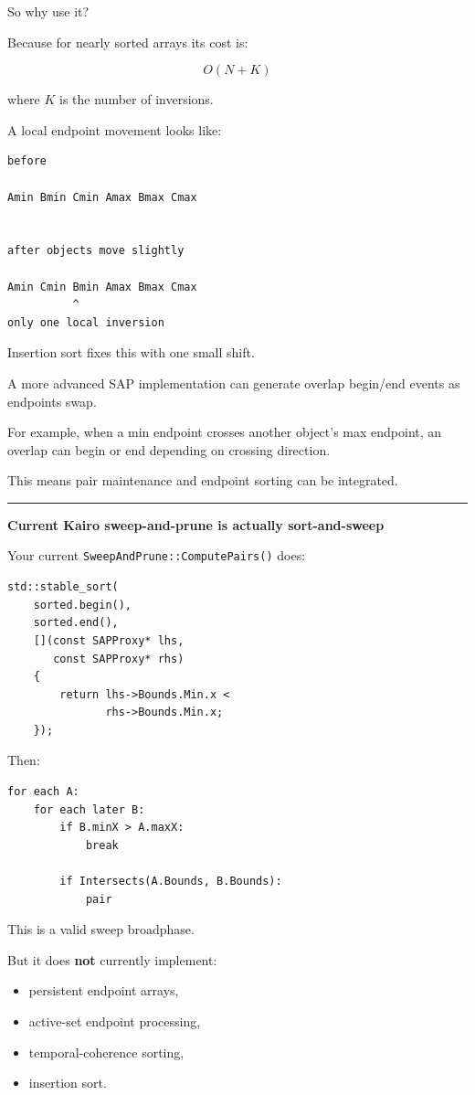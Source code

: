 So why use it?

Because for nearly sorted arrays its cost is:

\[
O(N+K)
\]

where \(K\) is the number of inversions.

A local endpoint movement looks like:

\begin{verbatim}
before

Amin Bmin Cmin Amax Bmax Cmax


after objects move slightly

Amin Cmin Bmin Amax Bmax Cmax
          ^
only one local inversion
\end{verbatim}

Insertion sort fixes this with one small shift.

A more advanced SAP implementation can generate overlap begin/end events as endpoints swap.

For example, when a min endpoint crosses another object's max endpoint, an overlap can begin or end depending on crossing direction.

This means pair maintenance and endpoint sorting can be integrated.

\begin{center}\rule{0.5\linewidth}{0.5pt}\end{center}

\textbf{Current Kairo sweep-and-prune is actually sort-and-sweep}

Your current \texttt{SweepAndPrune::ComputePairs()} does:

\begin{verbatim}
std::stable_sort(
    sorted.begin(),
    sorted.end(),
    [](const SAPProxy* lhs,
       const SAPProxy* rhs)
    {
        return lhs->Bounds.Min.x <
               rhs->Bounds.Min.x;
    });
\end{verbatim}

Then:

\begin{verbatim}
for each A:
    for each later B:
        if B.minX > A.maxX:
            break

        if Intersects(A.Bounds, B.Bounds):
            pair
\end{verbatim}

This is a valid sweep broadphase.

But it does \textbf{not} currently implement:

\begin{itemize}
\tightlist
\item
  persistent endpoint arrays,
\item
  active-set endpoint processing,
\item
  temporal-coherence sorting,
\item
  insertion sort.
\end{itemize}

